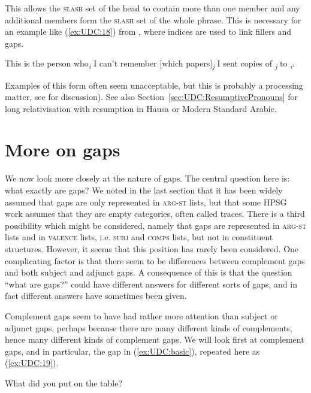 \documentclass[output=paper
                ,modfonts
                ,nonflat
	        ,collection
	        ,collectionchapter
	        ,collectiontoclongg
 	        ,biblatex
                ,babelshorthands
                ,newtxmath
                ,draftmode
                ,colorlinks, citecolor=brown
]{./langsci/langscibook}
\begin{document}
{\noindent
This allows the \textsc{slash} set of the head to contain more than one member
and any additional members form the \textsc{slash} set of the whole phrase. This
is necessary for an example like (\ref{ex:UDC:18}) from \citet{Chaves:12}, where indices
are used to link fillers and gaps.

\begin{exe}
\ex \label{ex:UDC:18}
 This is the person who\emph{\textsubscript{i}} I can't remember
{[}which papers{]}\emph{\textsubscript{j}} I sent copies of \trace{}
\emph{\textsubscript{j}} to \trace{}\emph{\textsubscript{i}}.
\end{exe}

\noindent
Examples of this form often seem unacceptable, but this is probably a
processing matter, see \citet[Section~3]{Chaves:12} for discussion).
See also Section~\ref{sec:UDC:ResumptivePronouns} for long
relativisation with resumption in Hausa or Modern Standard Arabic.

\section{More on gaps}
\label{sec:UDC:MoreOnGaps}


We now look more closely at the nature of gaps. The central question
here is: what exactly are gaps? We noted in the last section that it
has been widely assumed that gaps are only represented in
\textsc{arg-st} lists, but that some HPSG work assumes that they are
empty categories, often called traces. There is a third possibility
which might be considered, namely that gaps are represented in
\textsc{arg-st} lists and in \textsc{valence} lists,
i.e. \textsc{subj} and \textsc{comps} lists, but not in constituent
structures. However, it seems that this position has rarely been
considered. One complicating factor is that there seem to be
differences between complement gaps and both subject and adjunct
gaps. A consequence of this is that the question ``what are gaps?''
could have different answers for different sorts of gaps, and in fact
different answers have sometimes been given.

Complement gaps seem to have had rather more attention than subject or
adjunct gaps, perhaps because there are many different kinds of
complements, hence many different kinds of complement gaps. We will look
first at complement gaps, and in particular, the gap in (\ref{ex:UDC:basic}), repeated
here as (\ref{ex:UDC:19}).

\begin{exe}
\ex \label{ex:UDC:19}
What did you put \trace{} on the table?
\end{exe}

}
\end{document}
